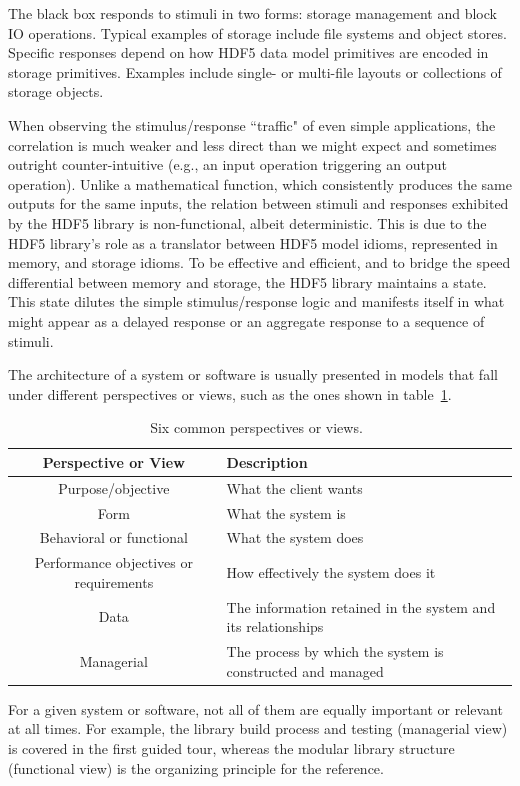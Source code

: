 The black box responds to stimuli in two forms: storage management and block IO operations. Typical examples of storage include file systems and object stores. Specific responses depend on how HDF5 data model primitives are encoded in storage primitives. Examples include single- or multi-file layouts or collections of storage objects.

When observing the stimulus/response ``traffic" of even simple applications, the correlation is much weaker and less direct than we might expect and sometimes outright counter-intuitive (e.g., an input operation triggering an output operation). Unlike a mathematical function, which consistently produces the same outputs for the same inputs, the relation between stimuli and responses exhibited by the HDF5 library is non-functional, albeit deterministic. This is due to the HDF5 library's role as a translator between HDF5 model idioms, represented in memory, and storage idioms. To be effective and efficient, and to bridge the speed differential between memory and storage, the HDF5 library maintains a state. This state dilutes the simple stimulus/response logic and manifests itself in what might appear as a delayed response or an aggregate response to a sequence of stimuli.

The architecture of a system or software is usually presented in models that fall under different perspectives or views, such as the ones shown in table~\ref{table:perspectives}.

\begin{table}[h!]
\begin{tabular}{||c|l||}
\hline
Perspective or View & Description \\  [0.5ex] 
\hline\hline
Purpose/objective & What the client wants \\  
Form & What the system is \\
Behavioral or functional & What the system does\\
Performance objectives or requirements & How effectively the system does it\\
Data & The information retained in the system and its relationships\\
Managerial & The process by which the system is constructed and managed\\ [1ex] 
\hline
\end{tabular}
\caption{Six common perspectives or views.~\cite{maier2009}}
\label{table:perspectives}
\end{table}

For a given system or software, not all of them are equally important or relevant at all times. For example, the library build process and testing (managerial view) is covered in the first guided tour, whereas the modular library structure (functional view) is the organizing principle for the reference.

